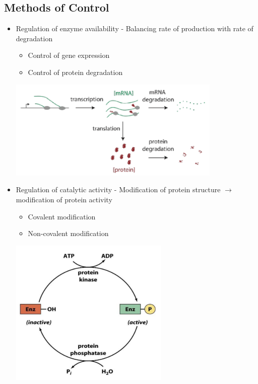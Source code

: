 \documentclass[10pt]{article}
\begin{document}
\subsection*{Methods of Control}
\begin{itemize}
    \item Regulation of enzyme availability - Balancing rate of production with rate of degradation
    \begin{itemize}
        \item Control of gene expression
        \item Control of protein degradation
    \end{itemize}
    \begin{center}
        \includegraphics*[width=0.8\textwidth]{L1_3.png}
    \end{center}
    \item Regulation of catalytic activity - Modification of protein structure $\rightarrow$ modification of protein activity
    \begin{itemize}
        \item Covalent modification
        \item Non-covalent modification
    \end{itemize}
    \begin{center}
        \includegraphics*[width=0.6\textwidth]{L1_4.png}
    \end{center}
\end{itemize}
\end{document}
